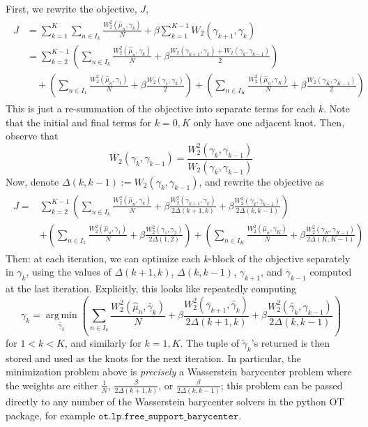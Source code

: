 \documentclass[aos, preprint]{imsart}
\theoremstyle{plain}
\theoremstyle{remark}
\DeclareMathOperator*{\argmin}{arg\,min}
\begin{document}
\begin{appendix}
First, we rewrite the objective, $J$,
\begin{multline*}
\begin{aligned}
J &=  \sum_{k=1}^{K}\sum_{n\in I_{k}}\frac{W_{2}^{2}(\hat{\mu}_{n},\gamma_{k})}{N}+\beta\sum_{k=1}^{K-1}W_{2}(\gamma_{k+1},\gamma_{k})\\
 &= \sum_{k=2}^{K-1}\left(\sum_{n\in I_{k}}\frac{W_{2}^{2}(\hat{\mu}_{n},\gamma_{k})}{N}+\beta\frac{W_{2}(\gamma_{k+1},\gamma_{k})+W_{2}(\gamma_{k},\gamma_{k-1})}{2}\right)\\
 & \quad +\left(\sum_{n\in I_{1}}\frac{W_{2}^{2}(\hat{\mu}_{n},\gamma_{1})}{N}+\beta\frac{W_{2}(\gamma_{1},\gamma_{2})}{2}\right)+\left(\sum_{n\in I_{K}}\frac{W_{2}^{2}(\hat{\mu}_{n},\gamma_{K})}{N}+\beta\frac{W_{2}(\gamma_{K},\gamma_{K-1})}{2}\right)
\end{aligned}
\end{multline*}
This is just a re-summation of the objective into separate terms
for each $k$. Note that the initial and final terms for $k=0,K$ only have one adjacent knot. Then, observe that
\[
W_{2}(\gamma_{k},\gamma_{k-1})=\frac{W_{2}^{2}(\gamma_{k},\gamma_{k-1})}{W_{2}(\gamma_{k},\gamma_{k-1})}
\]
Now, denote $\Delta(k,k-1):=W_{2}(\gamma_{k},\gamma_{k-1})$, and
rewrite the objective as
\begin{multline*}
\begin{aligned}
J = &\sum_{k=2}^{K-1}\left(\sum_{n\in I_{k}}\frac{W_{2}^{2}(\hat{\mu}_{n},\gamma_{k})}{N}+\beta\frac{W_{2}^{2}(\gamma_{k+1},\gamma_{k})}{2\Delta(k+1,k)}+\beta\frac{W_{2}^{2}(\gamma_{k},\gamma_{k-1})}{2\Delta(k,k-1)}\right)\\
& +\left(\sum_{n\in I_{1}}\frac{W_{2}^{2}(\hat{\mu}_{n},\gamma_{1})}{N}+\beta\frac{W_{2}^{2}(\gamma_{1},\gamma_{2})}{2\Delta(1,2)}\right)+\left(\sum_{n\in I_{K}}\frac{W_{2}^{2}(\hat{\mu}_{n},\gamma_{K})}{N}+\beta\frac{W_{2}^{2}(\gamma_{K},\gamma_{K-1})}{2\Delta(K,K-1)}\right)
\end{aligned}
\end{multline*}
Then: at each iteration, we can optimize each $k$-block of the objective
separately in $\gamma_{k}$, using the values of $\Delta(k+1,k)$,
$\Delta(k,k-1)$, $\gamma_{k+1}$, and $\gamma_{k-1}$ computed at
the last iteration. Explicitly, this looks like repeatedly computing
\[
\gamma_k = \argmin\limits_{\tilde{\gamma_{k}}}\left(\sum_{n\in I_{k}}\frac{W_{2}^{2}(\hat{\mu}_{n},\tilde{\gamma_{k}})}{N}+\beta\frac{W_{2}^{2}(\gamma_{k+1},\tilde{\gamma_{k}})}{2\Delta(k+1,k)}+\beta\frac{W_{2}^{2}(\tilde{\gamma_{k}},\gamma_{k-1})}{2\Delta(k,k-1)}\right)
\]
for $1<k<K$, and similarly for $k=1,K$. The tuple of $\tilde{\gamma}_{k}$'s
returned is then stored and used as the knots for the next iteration.
In particular, the minimization problem above is \emph{precisely}
a Wasserstein barycenter problem where the weights are either $\frac{1}{N}$,
$\frac{\beta}{2\Delta(k+1,k)}$, or $\frac{\beta}{2\Delta(k,k-1)}$; this
problem can be passed directly to any number of the Wasserstein barycenter
solvers in the python OT package, for example $\mathtt{ot.lp.free\_support\_barycenter}$.


\end{appendix}
\end{document}
